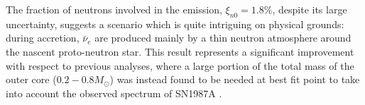 \documentclass[a4paper,11pt]{article}
\begin{document}

 The fraction of neutrons involved in the emission,  
$\xi_{n0}=1.8\%$, despite its large uncertainty, suggests a scenario which is quite intriguing on physical grounds: during accretion,  $\bar\nu_e$ are produced mainly by a thin neutron atmosphere around the nascent proto-neutron star. This result represents a significant improvement with respect to previous analyses, where a large portion of the total mass of the outer core ($0.2-0.8 M_{\odot}$) was instead found to be 
needed at best fit point 
to take into account the observed spectrum of SN1987A \cite{Loredo:2001rx, Pagliaroli:2008ur}.









 
\end{document}
